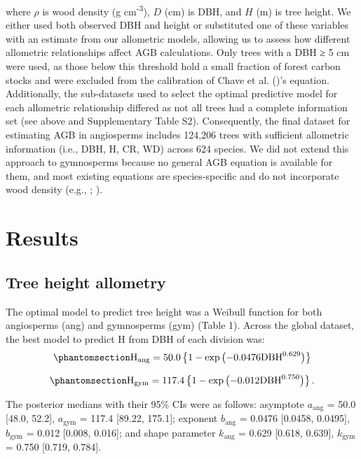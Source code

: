 \documentclass[
  12pt,
  letterpaper,
  DIV=11,
  numbers=noendperiod]{scrartcl}
\begin{document}
where \(\rho\) is wood density (g cm\textsuperscript{-3}), \(D\) (cm) is
DBH, and \(H\) (m) is tree height. We either used both observed DBH and
height or substituted one of these variables with an estimate from our
allometric models, allowing us to assess how different allometric
relationships affect AGB calculations. Only trees with a DBH ≥ 5 cm were
used, as those below this threshold hold a small fraction of forest
carbon stocks and were excluded from the calibration of Chave et al.
()'s equation. Additionally, the
sub-datasets used to select the optimal predictive model for each
allometric relationship differed as not all trees had a complete
information set (see above and Supplementary Table S2). Consequently,
the final dataset for estimating AGB in angiosperms includes 124,206
trees with sufficient allometric information (i.e., DBH, H, CR, WD)
across 624 species. We did not extend this approach to gymnosperms
because no general AGB equation is available for them, and most existing
equations are species-specific and do not incorporate wood density
(e.g., ;
).

\section{Results}\label{results}

\subsection{Tree height allometry}\label{tree-height-allometry}

The optimal model to predict tree height was a Weibull function for both
angiosperms (ang) and gymnosperms (gym) (Table 1). Across the global
dataset, the best model to predict H from DBH of each division was:
\begin{equation}\phantomsection\label{eq-h_ang}{
\mathrm{H_{ang}} =50.0
\left\{ 1 - \exp\left( - 0.0476
\mathrm{DBH}^{0.629}
\right) \right\}
}\end{equation}

\begin{equation}\phantomsection\label{eq-h_gym}{
\mathrm{H_{gym}} = 117.4
\left\{ 1 - \exp\left( - 0.012
\mathrm{DBH}^{0.750}
\right) \right\}.
}\end{equation}

The posterior medians with their 95\% CIs were as follows: asymptote
\(a_{\text{ang}}\) = 50.0 {[}48.0, 52.2{]}, \(a_{\text{gym}}\) = 117.4
{[}89.22, 175.1{]}; exponent \(b_{\text{ang}}\) = 0.0476 {[}0.0458,
0.0495{]}, \(b_{\text{gym}}\) = 0.012 {[}0.008, 0.016{]}; and shape
parameter \(k_{\text{ang}}\) = 0.629 {[}0.618, 0.639{]},
\(k_{\text{gym}}\) = 0.750 {[}0.719, 0.784{]}.
\end{document}
